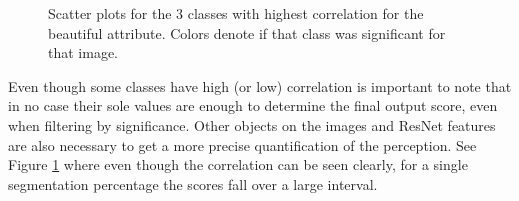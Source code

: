 \begin{figure}[ht]
	\centering
	\hspace{0mm}
	\caption[Score vs segmentation scatter plots]{
		Scatter plots for the 3 classes with highest correlation for the beautiful attribute.
		Colors denote if that class was significant for that image.
	}
	\label{fig:scatters}
\end{figure}

Even though some classes have high (or low) correlation is important to note that in no case
their sole values are enough to determine the final output score, even when filtering by significance.
Other objects on the images and ResNet features are also necessary to get a more precise
quantification of the perception. See Figure \ref{fig:scatters} where even though the correlation
can be seen clearly, for a single segmentation percentage the scores fall over a large interval.

